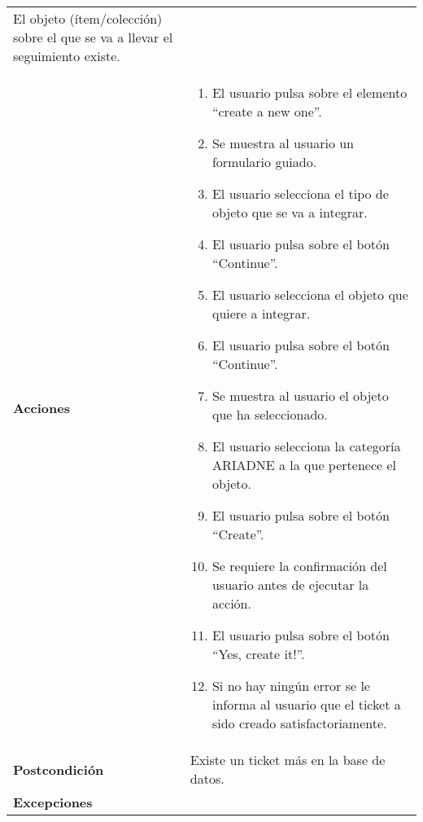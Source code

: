 \begin{longtable}[]{@{}ll@{}}
\begin{minipage}[t]{0.78\columnwidth}
El objeto (ítem/colección) sobre el que se va a llevar el seguimiento
existe.\strut
\end{minipage}\tabularnewline
\begin{minipage}[t]{0.16\columnwidth}\raggedright
\textbf{Acciones}\strut
\end{minipage} & \begin{minipage}[t]{0.78\columnwidth}\raggedright
\begin{enumerate}
\def\labelenumi{\arabic{enumi}.}
\tightlist
\item
  El usuario pulsa sobre el elemento ``create a new one''.
\item
  Se muestra al usuario un formulario guiado.
\item
  El usuario selecciona el tipo de objeto que se va a integrar.
\item
  El usuario pulsa sobre el botón ``Continue''.
\item
  El usuario selecciona el objeto que quiere a integrar.
\item
  El usuario pulsa sobre el botón ``Continue''.
\item
  Se muestra al usuario el objeto que ha seleccionado.
\item
  El usuario selecciona la categoría ARIADNE a la que pertenece el
  objeto.
\item
  El usuario pulsa sobre el botón ``Create''.
\item
  Se requiere la confirmación del usuario antes de ejecutar la acción.
\item
  El usuario pulsa sobre el botón ``Yes, create it!''.
\item
  Si no hay ningún error se le informa al usuario que el ticket a sido
  creado satisfactoriamente.
\end{enumerate}\strut
\end{minipage}\tabularnewline
\begin{minipage}[t]{0.16\columnwidth}\raggedright
\textbf{Postcondición}\strut
\end{minipage} & \begin{minipage}[t]{0.78\columnwidth}\raggedright
Existe un ticket más en la base de datos.\strut
\end{minipage}\tabularnewline
\begin{minipage}[t]{0.16\columnwidth}\raggedright
\textbf{Excepciones}\strut
\end{minipage} & \begin{minipage}[t]{0.78\columnwidth}\raggedright
\begin{itemize}

\end{itemize}
\end{minipage}
\end{longtable}
